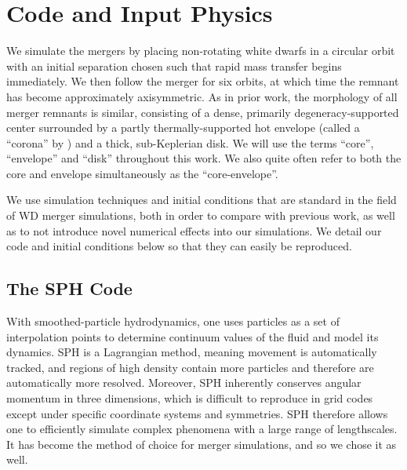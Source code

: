\section{Code and Input Physics}
\label{sec:gasoline}

We simulate the mergers by placing non-rotating white dwarfs in a circular orbit with an initial separation {\azero} chosen such that rapid mass transfer begins immediately.  We then follow the merger for six orbits, at which time the remnant has become approximately axisymmetric.  As in prior work, the morphology of all merger remnants is similar, consisting of a dense, primarily degeneracy-supported center surrounded by a partly thermally-supported hot envelope (called a ``corona'' by \citeal{loreig09}) and a thick, sub-Keplerian disk.  We will use the terms ``core'', ``envelope'' and ``disk'' throughout this work.  We also quite often refer to both the core and envelope simultaneously as the ``core-envelope''.

We use simulation techniques and initial conditions that are standard in the field of WD merger simulations, both in order to compare with previous work, as well as to not introduce novel numerical effects into our simulations.  We detail our code and initial conditions below so that they can easily be reproduced.

\subsection{The SPH Code}
\label{ssec:sphcode}

With smoothed-particle hydrodynamics, one uses particles as a set of interpolation points to determine continuum values of the fluid and model its dynamics.  SPH is a Lagrangian method, meaning movement is automatically tracked, and regions of high density contain more particles and therefore are automatically more resolved.  Moreover, SPH inherently conserves angular momentum in three dimensions, which is difficult to reproduce in grid codes except under specific coordinate systems and symmetries.  SPH therefore allows one to efficiently simulate complex phenomena with a large range of lengthscales.  It has become the method of choice for merger simulations, and so we chose it as well.


